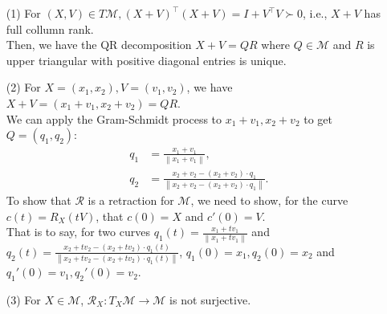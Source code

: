 \documentclass[en, oneside]{assignment}
\begin{document}
\begin{sol}
    \begin{itemize}
        \item[(1)] For $(X, V) \in T\mathcal{M}, (X + V)^\top(X + V) = I + V^\top V \succ 0$, i.e., $X + V$ has full collumn rank.\\
        Then, we have the QR decomposition $X + V = QR$ where $Q \in \mathcal{M}$ and $R$ is upper triangular with positive diagonal entries is unique.
        \item[(2)] For $X = (x_1, x_2), V = (v_1, v_2)$, we have $X + V = (x_1 + v_1, x_2 + v_2) = QR$.\\
        We can apply the Gram-Schmidt process to $x_1 + v_1, x_2 + v_2$ to get $Q = (q_1, q_2)$:
        \begin{align*}
            q_1 & = \frac{x_1 + v_1}{\left\lVert x_1 + v_1 \right\rVert},\\
            q_2 & = \frac{x_2 + v_2 - (x_2 + v_2) \cdot q_1}{\left\lVert x_2 + v_2 - (x_2 + v_2) \cdot q_1 \right\rVert}.
        \end{align*}
        To show that $\mathcal{R}$ is a retraction for $\mathcal{M}$, we need to show, for the curve $c(t) = R_X(tV)$, that $c(0) = X$ and $c'(0) = V$.\\
        That is to say, for two curves $q_1(t) = \frac{x_1 + tv_1}{\left\lVert x_1 + tv_1 \right\rVert}$ 
        and $q_2(t) = \frac{x_2 + tv_2 - (x_2 + tv_2) \cdot q_1(t)}{\left\lVert x_2 + tv_2 - (x_2 + tv_2) \cdot q_1(t) \right\rVert}$, $q_1(0) = x_1, q_2(0) = x_2$ and $q_1'(0) = v_1, q_2'(0) = v_2$.
        \item[(3)] For $X \in \mathcal{M}$, $\mathcal{R}_X: T_X\mathcal{M} \rightarrow \mathcal{M}$ is not surjective.
    \end{itemize}
\end{sol}
\end{document}
